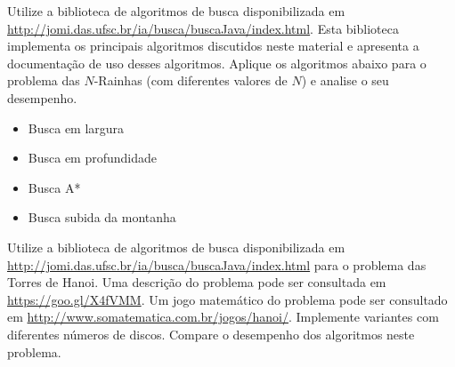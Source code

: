 \begin{exercise}
Utilize a biblioteca de algoritmos de busca disponibilizada em \url{http://jomi.das.ufsc.br/ia/busca/buscaJava/index.html}. Esta biblioteca implementa os principais algoritmos discutidos neste material e apresenta a documentação de uso desses algoritmos. Aplique os algoritmos abaixo para o problema das $N$-Rainhas (com diferentes valores de $N$) e analise o seu desempenho.

\begin{itemize}
	\item Busca em largura
	\item Busca em profundidade
	\item Busca A*
	\item Busca subida da montanha
\end{itemize}
\end{exercise}

\begin{exercise}
Utilize a biblioteca de algoritmos de busca disponibilizada em \url{http://jomi.das.ufsc.br/ia/busca/buscaJava/index.html} para o problema das Torres de Hanoi. Uma descrição do problema pode ser consultada em \url{https://goo.gl/X4fVMM}. Um jogo matemático do problema pode ser consultado em \url{http://www.somatematica.com.br/jogos/hanoi/}. Implemente variantes com diferentes números de discos. Compare o desempenho dos algoritmos neste problema.
\end{exercise}